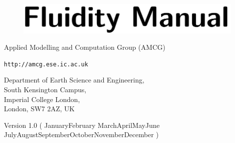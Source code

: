 \documentclass[11pt,a4paper]{book}
\def\today{\number\day\space\ifcase\month\or
 January\or February \or March\or April\or May\or June\or
 July\or August\or September\or October\or November\or December\fi
 \space\number\year}
\begin{document}


\frontmatter

\begin{titlepage}

\begin{center}

\mbox{}

\vfill


\begin{figure}[h]
\centering
\includegraphics[]{misc_images/manual_title.pdf}
\end{figure}


\vspace{40mm}

{\LARGE
Applied Modelling and Computation Group (AMCG)
\\}

\vspace{1mm}


{\LARGE
\lstinline[language=html]+http://amcg.ese.ic.ac.uk+
\\}

\vspace{10mm}

{\LARGE
Department of Earth Science and Engineering,\\
South Kensington Campus,\\
Imperial College London,\\
London, SW7 2AZ, UK
\\}



\vspace{80mm}


{\Large
Version 1.0 (\today)
\\}

\vfill

\end{center}



\end{titlepage}
\end{document}
